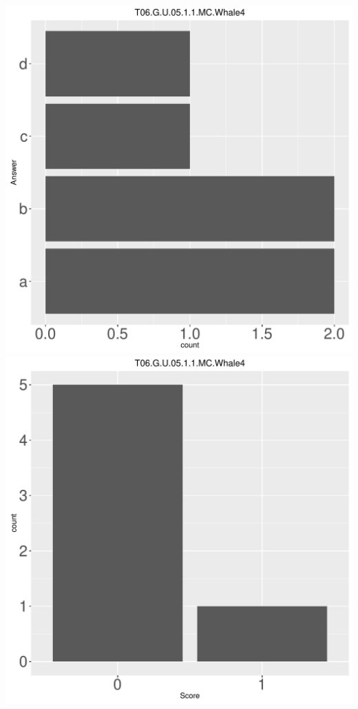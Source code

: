 \documentclass[12pt,english,nohyper]{tufte-handout}\usepackage[]{graphicx}\usepackage[]{color}
\begin{document}
\begin{center} \includegraphics[width=.45\linewidth]{Topic06_AB_88_answer} \includegraphics[width=.45\linewidth]{Topic06_AB_88_score} \end{center} 
\end{document}
